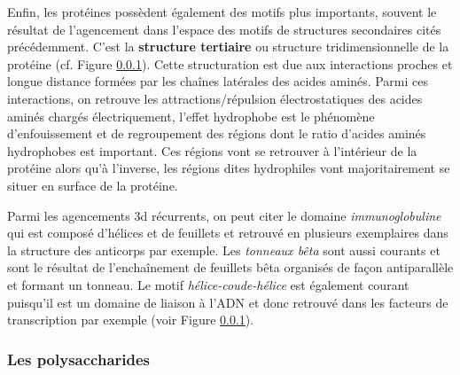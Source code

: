Enfin, les protéines possèdent également des motifs plus importants, souvent le résultat de l'agencement dans l'espace des motifs de structures secondaires cités précédemment. C'est la \textbf{structure tertiaire} ou structure tridimensionnelle de la protéine (cf. Figure \ref{}). 
Cette structuration est due aux interactions proches et longue distance formées par les chaînes latérales des acides aminés. Parmi ces interactions, on retrouve les attractions/répulsion électrostatiques des acides aminés chargés électriquement, l'effet hydrophobe est le phénomène d'enfouissement et de regroupement des régions dont le ratio d'acides aminés hydrophobes est important. Ces régions vont se retrouver à l'intérieur de la protéine alors qu'à l'inverse, les régions dites hydrophiles vont majoritairement se situer en surface de la protéine.

Parmi les agencements 3d récurrents, on peut citer le domaine \textit{immunoglobuline} qui est composé d'hélices et de feuillets et retrouvé en plusieurs exemplaires dans la structure des anticorps par exemple. Les \textit{tonneaux bêta} sont aussi courants et sont le résultat de l’enchaînement de feuillets bêta organisés de façon antiparallèle et formant un tonneau. Le motif \textit{hélice-coude-hélice} est également courant puisqu'il est un domaine de liaison à l'ADN et donc retrouvé dans les facteurs de transcription par exemple (voir Figure \ref{}).

\subsubsection{Les polysaccharides}

